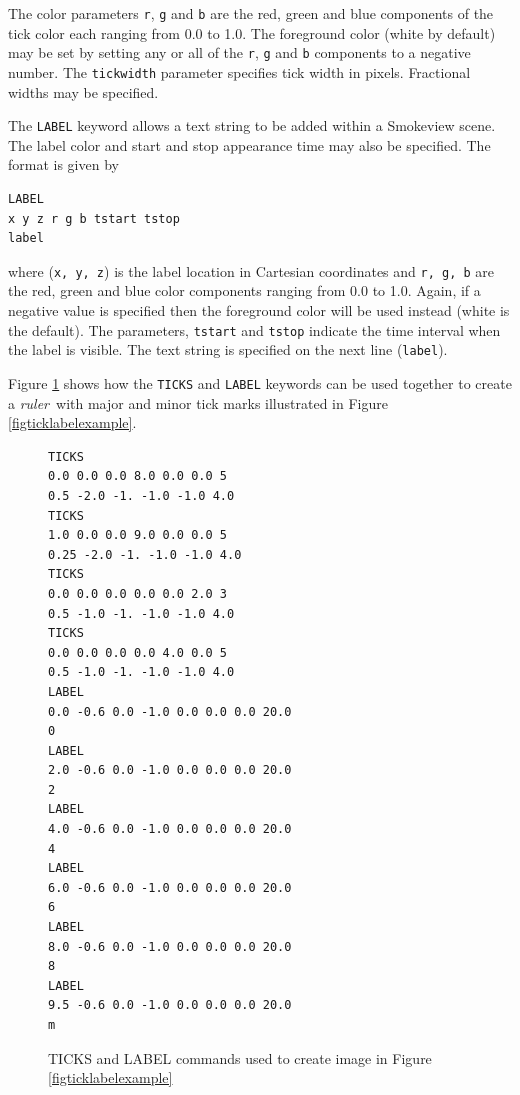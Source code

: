 \documentclass[11pt,twoside]{book}
\begin{document}
The color parameters {\tt r}, {\tt g} and {\tt b} are the
red, green and blue components of the tick color each
ranging from 0.0 to 1.0. The foreground color (white by
default) may be set by setting any or all of the {\tt r},
{\tt g} and {\tt b} components to a negative number. The
{\tt tickwidth} parameter specifies tick width in pixels.
Fractional widths may be specified.

The {\tt LABEL} keyword allows a text string to be added
within a Smokeview scene.  The label color and start and
stop appearance time may also be specified. The format is
given by

\begin{lstlisting}
LABEL
x y z r g b tstart tstop
label
\end{lstlisting}

\noindent where ({\tt x, y, z}) is the label location in Cartesian
coordinates and {\tt r, g, b} are the red, green and blue color
components ranging from 0.0 to 1.0.  Again, if a negative value is
specified then the foreground color will be used instead (white is
the default).  The parameters, {\tt tstart} and {\tt tstop}
indicate the time interval when the label is visible. The text
string is specified on the next line ({\tt label}).

Figure \ref{figticklabels} shows how the {\tt TICKS} and
{\tt LABEL} keywords can be used together to create a
{\em ruler}\ with major and minor tick marks illustrated in Figure
\ref{figticklabelexample}.

\begin{figure}[\figoptions]
{\small
\begin{lstlisting}
TICKS
0.0 0.0 0.0 8.0 0.0 0.0 5
0.5 -2.0 -1. -1.0 -1.0 4.0
TICKS
1.0 0.0 0.0 9.0 0.0 0.0 5
0.25 -2.0 -1. -1.0 -1.0 4.0
TICKS
0.0 0.0 0.0 0.0 0.0 2.0 3
0.5 -1.0 -1. -1.0 -1.0 4.0
TICKS
0.0 0.0 0.0 0.0 4.0 0.0 5
0.5 -1.0 -1. -1.0 -1.0 4.0
LABEL
0.0 -0.6 0.0 -1.0 0.0 0.0 0.0 20.0
0
LABEL
2.0 -0.6 0.0 -1.0 0.0 0.0 0.0 20.0
2
LABEL
4.0 -0.6 0.0 -1.0 0.0 0.0 0.0 20.0
4
LABEL
6.0 -0.6 0.0 -1.0 0.0 0.0 0.0 20.0
6
LABEL
8.0 -0.6 0.0 -1.0 0.0 0.0 0.0 20.0
8
LABEL
9.5 -0.6 0.0 -1.0 0.0 0.0 0.0 20.0
m
\end{lstlisting}
}
\caption{ TICKS and LABEL commands used to create image in Figure \ref{figticklabelexample}}
\label{figticklabels}%
\end{figure}
\end{document}
